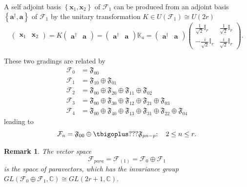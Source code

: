 \documentclass[aps, preprint]{revtex4}
\newtheorem{remark}[theorem]{Remark}
\begin{document}
A self adjoint basis $\left \{\mathbf{x}_{1} ,\mathbf{x}_{2}\right \}$ of $\mathcal{F}_{1}$ can be produced from an adjoint basis $\left \{\mathbf{a}^{ \dag } ,\mathbf{a}\right \}$ of $\mathcal{F}_{1}$ by the unitary transformation $K \in U \left (\mathcal{F}_{1}\right ) \cong U \left (2 r\right )$
\begin{equation}\left (\begin{array}{cc}\mathbf{x}_{1} & \mathbf{x}_{2}\end{array}\right ) =K \left (\begin{array}{cc}\mathbf{a}^{ \dag } & \mathbf{a}\end{array}\right ) =\left (\begin{array}{cc}\mathbf{a}^{ \dag } & \mathbf{a}\end{array}\right ) \mathbb{K}_{a} =\left (\begin{array}{cc}\mathbf{a}^{ \dag } & \mathbf{a}\end{array}\right ) \left (\begin{array}{cc}\frac{1}{\sqrt{2}} \mathbb{I}_{r} & \frac{1}{\sqrt{2}} \mathbb{I}_{r} \\
 -\frac{i}{\sqrt{2}} \mathbb{I}_{r} & \frac{i}{\sqrt{2}} \mathbb{I}_{r}\end{array}\right )\text{.}
\end{equation}

These two gradings are related by
\begin{align}\mathcal{F}_{0} &  =\mathfrak{F}_{0 0} \\
\mathcal{F}_{1} &  =\mathfrak{F}_{1 0} \oplus \mathfrak{F}_{0 1} \\
\mathcal{F}_{2} &  =\mathfrak{F}_{0 0} \oplus \mathfrak{F}_{2 0} \oplus \mathfrak{F}_{1 1} \oplus \mathfrak{F}_{0 2} \\
\mathcal{F}_{3} &  =\mathfrak{F}_{0 0} \oplus \mathfrak{F}_{3 0} \oplus \mathfrak{F}_{1 2} \oplus \mathfrak{F}_{2 1} \oplus \mathfrak{F}_{0 3} \\
\mathcal{F}_{4} &  =\mathfrak{F}_{0 0} \oplus \mathfrak{F}_{4 0} \oplus \mathfrak{F}_{1 3} \oplus \mathfrak{F}_{3 1} \oplus \mathfrak{F}_{2 2} \oplus \mathfrak{F}_{0 4}\end{align}leading to
\begin{equation}\mathcal{F}_{n} =\mathfrak{F}_{0 0} \oplus \tbigoplus ???\mathfrak{F}_{p n -p} ;\text{\quad }2 \leq n \leq r\text{.}
\end{equation}


\begin{remark}
The vector space
\begin{equation}\mathcal{F}_{p a r a} =\mathcal{F}_{\left (1\right )} =\mathcal{F}_{0} \oplus \mathcal{F}_{1}
\end{equation}is the space of \emph{paravectors}, which has the invariance group $G L \left (\mathcal{F}_{0} \oplus \mathcal{F}_{1} ,\mathbb{C}\right ) \cong G L \left (2 r +1 ,\mathbb{C}\right )\text{.}$ 
\end{remark}
\end{document}
